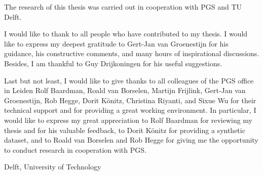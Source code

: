 \documentclass[a4paper,11pt]{mscThesis}
\begin{document}
    The research of this thesis was carried out in cooperation with PGS and TU Delft. 
     
    I would like to thank to all people who have contributed to my thesis. I would like to express my deepest gratitude to Gert-Jan van Groenestijn for his guidance, his constructive comments, and many hours of inspirational discussions. Besides, I am thankful to Guy Drijkoningen for his useful suggestions. 
    
    Last but not least, I would like to give thanks to all colleagues of the PGS office in Leiden Rolf Baardman, Roald van Borselen, Martijn Frijlink, Gert-Jan van Groenestijn, Rob Hegge, Dorit K\"{o}nitz, Christina Riyanti, and Sixue Wu for their technical support and for providing a great working environment. In particular, I would like to express my great appreciation to Rolf Baardman for reviewing my thesis and for his valuable feedback, to Dorit K\"{o}nitz for providing a synthetic dataset, and to Roald van Borselen and Rob Hegge for giving me the opportunity to conduct research in cooperation with PGS.

    \vspace*{15mm}

    \noindent
    Delft, University of Technology \hfill \mscname\\ %
    \mscdate


%
    



\end{document}
